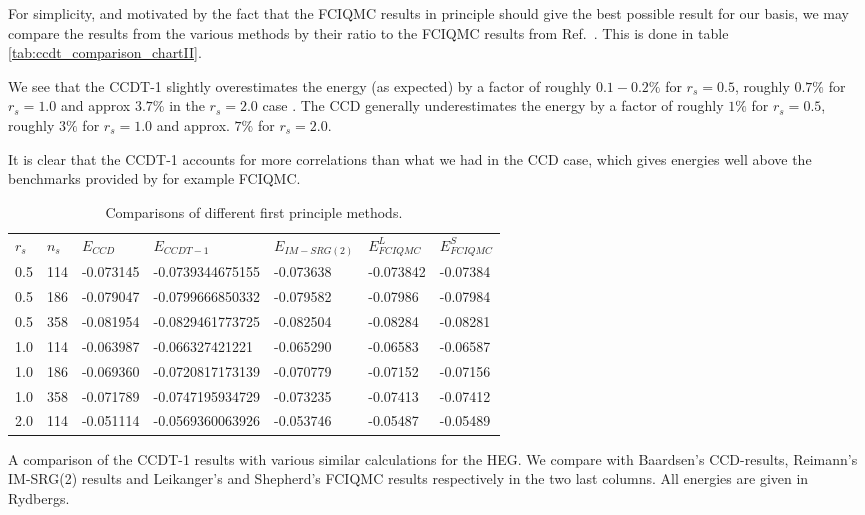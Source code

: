 For simplicity, and motivated by the fact that the FCIQMC results in
principle should give the best possible result for our basis, we may
compare the results from the various methods by their ratio to the
FCIQMC results from Ref.~\cite{Shepherd2012}. This is done in table
\ref{tab:ccdt_comparison_chartII}.

We see that the CCDT-1 slightly overestimates the energy (as expected)
by a factor of roughly $0.1-0.2 \%$ for $r_s = 0.5$, roughly $0.7 \%$
for $r_s = 1.0$ and approx $3.7 \%$ in the $r_s = 2.0$ case . The CCD
generally underestimates the energy by a factor of roughly $1 \%$ for
$r_s = 0.5$, roughly $3\%$ for $r_s = 1.0$ and approx. $7 \%$ for $r_s
= 2.0$.

It is clear that the CCDT-1 accounts for more correlations than what we had in the CCD case, which gives energies
well above the benchmarks provided by for example FCIQMC.






\begin{table}[hbtp]
\caption{Comparisons of different first principle methods.}
\begin{center}
\begin{threeparttable}
\begin{tabular}{l l l l l l l}
    \toprule
$r_s$ & $n_s$ & $E_{CCD}$  & $E_{CCDT-1}$ & $E_{IM-SRG(2)}$ &$ E^L_{FCIQMC}$ & $E^S_{FCIQMC}$ \\
0.5 &114 &-0.073145&-0.0739344675155&-0.073638&-0.073842&-0.07384\\
0.5 &186 &-0.079047&-0.0799666850332&-0.079582&-0.07986&-0.07984 \\
0.5 &358 &-0.081954&-0.0829461773725&-0.082504&-0.08284&-0.08281 \\ \hline
1.0 &114 &-0.063987&-0.066327421221&-0.065290&-0.06583&-0.06587 \\
1.0 &186 &-0.069360&-0.0720817173139&-0.070779&-0.07152&-0.07156 \\
1.0 &358 &-0.071789&-0.0747195934729&-0.073235&-0.07413&-0.07412 \\ \hline
2.0 &114 &-0.051114&-0.0569360063926&-0.053746&-0.05487&-0.05489 \\
\bottomrule
\end{tabular}
\begin{tablenotes}
A comparison of the CCDT-1 results with various similar calculations for the HEG. We compare with Baardsen's \cite{Baardsen2014} CCD-results, Reimann's IM-SRG(2) results \cite{Reimann2013} and Leikanger's \cite{Leikanger2013} and Shepherd's \cite{Shepherd2012} FCIQMC results respectively in the two last columns. All energies are given in Rydbergs.
\end{tablenotes}
\end{threeparttable}
\end{center}
\label{tab:ccdt_comparison_chart}
\end{table}

